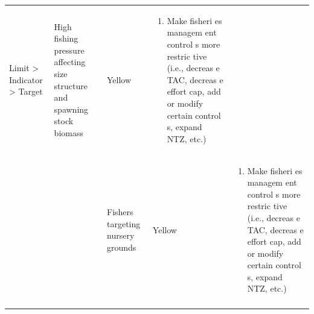 \documentclass[]{book}
\providecommand{\tightlist}{%
  \setlength{\itemsep}{0pt}\setlength{\parskip}{0pt}}
\begin{document}
\begin{longtable}[]{@{}lllll@{}}
\begin{minipage}[t]{0.19\columnwidth}
Limit \textgreater{} Indicator \textgreater{} Target\strut
\end{minipage} & \begin{minipage}[t]{0.19\columnwidth}\raggedright\strut
High fishing pressure affecting size structure and spawning stock
biomass\strut
\end{minipage} & \begin{minipage}[t]{0.19\columnwidth}\raggedright\strut
Yellow\strut
\end{minipage} & \begin{minipage}[t]{0.19\columnwidth}\raggedright\strut
\begin{enumerate}
\def\labelenumi{\arabic{enumi}.}
\tightlist
\item
  Make fisheri es managem ent control s more restric tive (i.e., decreas
  e TAC, decreas e effort cap, add or modify certain control s, expand
  NTZ, etc.)
\end{enumerate}\strut
\end{minipage}\tabularnewline
\begin{minipage}[t]{0.19\columnwidth}\raggedright\strut
\strut
\end{minipage} & \begin{minipage}[t]{0.19\columnwidth}\raggedright\strut
\strut
\end{minipage} & \begin{minipage}[t]{0.19\columnwidth}\raggedright\strut
Fishers targeting nursery grounds\strut
\end{minipage} & \begin{minipage}[t]{0.19\columnwidth}\raggedright\strut
Yellow\strut
\end{minipage} & \begin{minipage}[t]{0.19\columnwidth}\raggedright\strut
\begin{enumerate}
\def\labelenumi{\arabic{enumi}.}
\tightlist
\item
  Make fisheri es managem ent control s more restric tive (i.e., decreas
  e TAC, decreas e effort cap, add or modify certain control s, expand
  NTZ, etc.)
\end{enumerate}\strut
\end{minipage}\tabularnewline
\begin{minipage}[t]{0.19\columnwidth}\raggedright\strut
\strut
\end{minipage} & \begin{minipage}[t]{0.19\columnwidth}\raggedright\strut
\strut
\end{minipage} & \begin{minipage}[t]{0.19\columnwidth}\raggedright\strut

\end{minipage}
\end{longtable}
\end{document}
